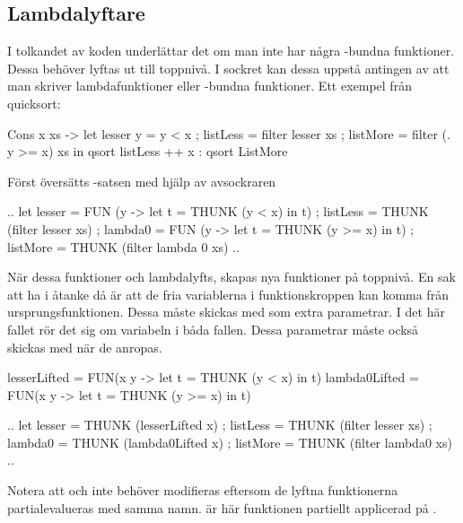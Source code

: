 \documentclass[../Core]{subfiles}
\begin{document}
\subsection{Lambdalyftare}
\label{sec:LamLift}

I tolkandet av koden underlättar det om man inte har några -bundna funktioner.
Dessa behöver lyftas ut till toppnivå. I sockret kan dessa uppstå antingen
av att man skriver lambdafunktioner eller -bundna funktioner. Ett exempel
från quicksort:

\begin{codeEx}
  Cons x xs ->
      let { lesser y = y < x
          ; listLess = filter lesser xs
          ; listMore = filter (\y . y >= x) xs
          }
      in  qsort listLess ++ x : qsort ListMore
\end{codeEx}

Först översätts -satsen med hjälp av avsockraren

\begin{codeEx}
  .. let { lesser = FUN (y -> let t = THUNK (y < x) in t)
         ; listLess = THUNK (filter lesser xs)
         ; lambda0 = FUN (y -> let t = THUNK (y >= x) in t)
         ; listMore = THUNK (filter lambda 0 xs)
         } ..
\end{codeEx}
      
När dessa funktioner  och  lambdalyfts, skapas nya funktioner
på toppnivå. En sak att ha i åtanke då är att de fria variablerna i funktionskroppen 
kan komma från ursprungsfunktionen. Dessa måste skickas med
som extra parametrar. I det här fallet rör det sig om variabeln  i båda fallen.
Dessa parametrar måste också skickas med när de anropas.
\begin{codeEx}
lesserLifted  = FUN(x y -> let t = THUNK (y <  x) in t)
lambda0Lifted = FUN(x y -> let t = THUNK (y >= x) in t)

    .. let { lesser   = THUNK (lesserLifted   x)
           ; listLess = THUNK (filter lesser  xs)
           ; lambda0  = THUNK (lambda0Lifted  x)
           ; listMore = THUNK (filter lambda0 xs)
           } ..
\end{codeEx}

Notera att  och  
inte behöver modifieras eftersom de lyftna funktionerna partialevalueras 
med samma namn.  är här funktionen 
partiellt applicerad på .
\end{document}
